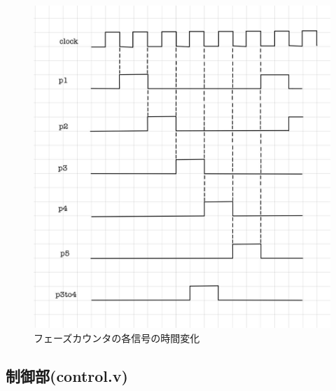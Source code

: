 \documentclass[a4j,titlepage]{jarticle}
\begin{document}
\begin{figure}[H]
    \begin{center}
        \includegraphics[scale = 0.22]{phaseCounterWaveShape.jpg}
    \end{center}
    \caption{フェーズカウンタの各信号の時間変化}
    \label{phaseCounterWaveShape}
\end{figure}




\newpage
\subsection{制御部(control.v)}
\end{document}
